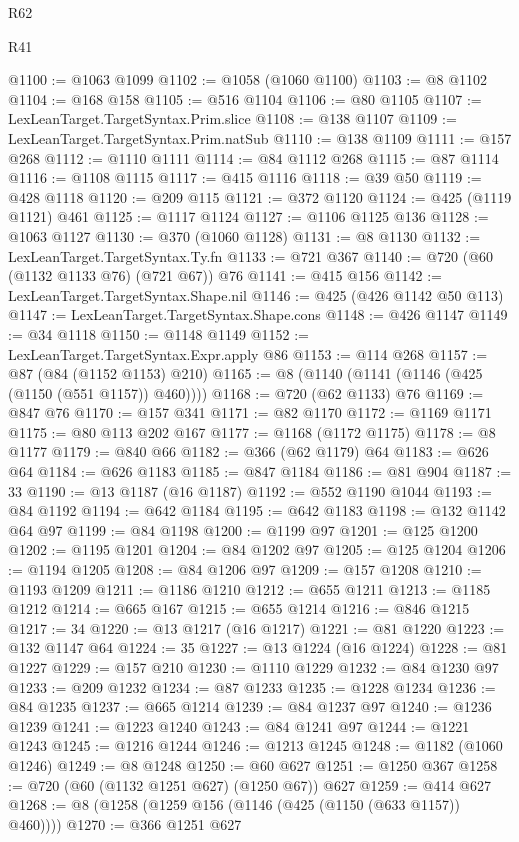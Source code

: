 \begin{lexlean}{R62}
\begin{lexlean}{R41}
\begin{coremodule}
{{{{{{{{{{{{{{{{{{{{{{{{{{{{{{{{{{{{{{{{{{{{{{{{{{{{{{{{{{{{{{{{{{{{{{{{{{{{{{{{{{{{{{{@1100 := @1063 @1099
@1102 := @1058 (@1060 @1100)
@1103 := @8 @1102
@1104 := @168 @158
@1105 := @516 @1104
@1106 := @80 @1105
@1107 := LexLeanTarget.TargetSyntax.Prim.slice
@1108 := @138 @1107
@1109 := LexLeanTarget.TargetSyntax.Prim.natSub
@1110 := @138 @1109
@1111 := @157 @268
@1112 := @1110 @1111
@1114 := @84 @1112 @268
@1115 := @87 @1114
@1116 := @1108 @1115
@1117 := @415 @1116
@1118 := @39 @50
@1119 := @428 @1118
@1120 := @209 @115
@1121 := @372 @1120
@1124 := @425 (@1119 @1121) @461
@1125 := @1117 @1124
@1127 := @1106 @1125 @136
@1128 := @1063 @1127
@1130 := @370 (@1060 @1128)
@1131 := @8 @1130
@1132 := LexLeanTarget.TargetSyntax.Ty.fn
@1133 := @721 @367
@1140 := @720 (@60 (@1132 @1133 @76) (@721 @67)) @76
@1141 := @415 @156
@1142 := LexLeanTarget.TargetSyntax.Shape.nil
@1146 := @425 (@426 @1142 @50 @113)
@1147 := LexLeanTarget.TargetSyntax.Shape.cons
@1148 := @426 @1147
@1149 := @34 @1118
@1150 := @1148 @1149
@1152 := LexLeanTarget.TargetSyntax.Expr.apply @86
@1153 := @114 @268
@1157 := @87 (@84 (@1152 @1153) @210)
@1165 := @8 (@1140 (@1141 (@1146 (@425 (@1150 (@551 @1157)) @460))))
@1168 := @720 (@62 @1133) @76
@1169 := @847 @76
@1170 := @157 @341
@1171 := @82 @1170
@1172 := @1169 @1171
@1175 := @80 @113 @202 @167
@1177 := @1168 (@1172 @1175)
@1178 := @8 @1177
@1179 := @840 @66
@1182 := @366 (@62 @1179) @64
@1183 := @626 @64
@1184 := @626 @1183
@1185 := @847 @1184
@1186 := @81 @904
@1187 := 33
@1190 := @13 @1187 (@16 @1187)
@1192 := @552 @1190 @1044
@1193 := @84 @1192
@1194 := @642 @1184
@1195 := @642 @1183
@1198 := @132 @1142 @64 @97
@1199 := @84 @1198
@1200 := @1199 @97
@1201 := @125 @1200
@1202 := @1195 @1201
@1204 := @84 @1202 @97
@1205 := @125 @1204
@1206 := @1194 @1205
@1208 := @84 @1206 @97
@1209 := @157 @1208
@1210 := @1193 @1209
@1211 := @1186 @1210
@1212 := @655 @1211
@1213 := @1185 @1212
@1214 := @665 @167
@1215 := @655 @1214
@1216 := @846 @1215
@1217 := 34
@1220 := @13 @1217 (@16 @1217)
@1221 := @81 @1220
@1223 := @132 @1147 @64
@1224 := 35
@1227 := @13 @1224 (@16 @1224)
@1228 := @81 @1227
@1229 := @157 @210
@1230 := @1110 @1229
@1232 := @84 @1230 @97
@1233 := @209 @1232
@1234 := @87 @1233
@1235 := @1228 @1234
@1236 := @84 @1235
@1237 := @665 @1214
@1239 := @84 @1237 @97
@1240 := @1236 @1239
@1241 := @1223 @1240
@1243 := @84 @1241 @97
@1244 := @1221 @1243
@1245 := @1216 @1244
@1246 := @1213 @1245
@1248 := @1182 (@1060 @1246)
@1249 := @8 @1248
@1250 := @60 @627
@1251 := @1250 @367
@1258 := @720 (@60 (@1132 @1251 @627) (@1250 @67)) @627
@1259 := @414 @627
@1268 := @8 (@1258 (@1259 @156 (@1146 (@425 (@1150 (@633 @1157)) @460))))
@1270 := @366 @1251 @627
}}}}}}}}}}}}}}}}}}}}}}}}}}}}}}}}}}}}}}}}}}}}}}}}}}}}}}}}}}}}}}}}}}}}}}}}}}}}}}}}}}}}}}}
\end{coremodule}
\end{lexlean}
\end{lexlean}
